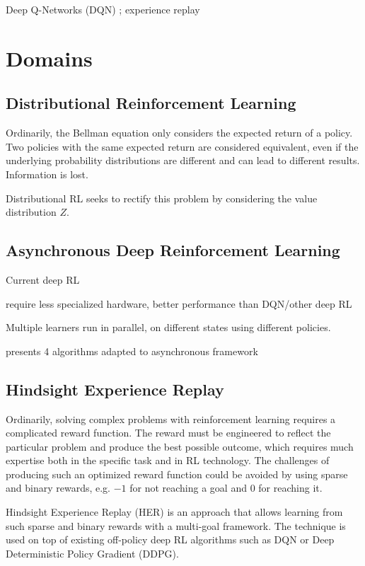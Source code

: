\documentclass[runningheads]{llncs}
\begin{document}
Deep Q-Networks (DQN) \cite{mnih2013playing}; experience replay

\section{Domains}

\subsection{Distributional Reinforcement Learning}

Ordinarily, the Bellman equation only considers the expected return of a policy. Two policies with the same expected return are considered equivalent, even if the underlying probability distributions are different and can lead to different results. Information is lost.

Distributional RL \cite{bellemare2017distributional} seeks to rectify this problem by considering the value distribution $Z$.

\subsection{Asynchronous Deep Reinforcement Learning}

Current deep RL 

require less specialized hardware, better performance than DQN/other deep RL

Multiple learners run in parallel, on different states using different policies.

\cite{mnih2016asynchronous} presents 4 algorithms adapted to asynchronous framework

\subsection{Hindsight Experience Replay}

Ordinarily, solving complex problems with reinforcement learning requires a complicated reward function. The reward must be engineered to reflect the particular problem and produce the best possible outcome, which requires much expertise both in the specific task and in RL technology. The challenges of producing such an optimized reward function could be avoided by using sparse and binary rewards, e.g. $-1$ for not reaching a goal and $0$ for reaching it.

Hindsight Experience Replay (HER) \cite{andrychowicz2017hindsight} is an approach that allows learning from such sparse and binary rewards with a multi-goal framework. The technique is used on top of existing off-policy deep RL algorithms such as DQN or Deep Deterministic Policy Gradient (DDPG).
\end{document}
